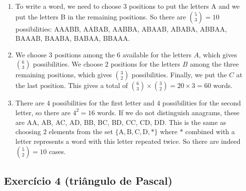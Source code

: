 \begin{enumerate}
\begin{center}
\end{center}
\item
  To write a word, we need to choose $3$ positions to put the letters A and we
  put the letters B in the remaining positions. So
  there are $\binom{5}{3} = 10$ possibilities:
  AAABB, AABAB, AABBA, ABAAB, ABABA, ABBAA, BAAAB, BAABA, BABAA, BBAAA.
\item
  We choose $3$ positions among the $6$ available
  for the letters $A$, which gives $\binom{6}{3}$ possibilities.
  We choose $2$ positions for the letters $B$ among the three remaining
  positions, which gives $\binom{3}{2}$ possibilities. Finally, we put the
  $C$ at the last position. This gives a total of
  $\binom{6}{3} \times \binom{3}{2} = 20 \times 3 = 60$ words.
\item There are $4$ possibilities for the first letter and
  $4$ possibilities for the second letter, so there are $4^2=16$ words.
  If we do not distinguish anagrams, these are
  AA, AB, AC, AD, BB, BC, BD, CC, CD, DD. This is the same as choosing
  $2$ elements from the set
  $\{\text{A}, \text{B}, \text{C}, \text{D}, \text{*} \}$
  where $\text{*}$ combined with a letter represents a word with this letter
  repeated twice. So there are indeed $\binom{5}{2} = 10$ cases.
\end{enumerate}

\subsection*{Exercício 4 (triângulo de Pascal)}

